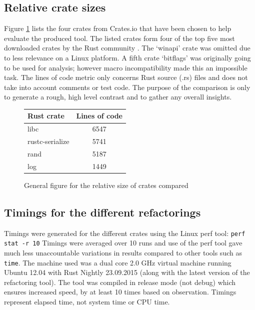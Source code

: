 \subsection{Relative crate sizes}
Figure \ref{Fig:codesize} lists the four crates from Crates.io that have been chosen to help evaluate the produced tool. The listed crates form four of the top five most downloaded crates by the Rust community \cite{cratesio15}. The `winapi' crate was omitted due to less relevance on a Linux platform. A fifth crate `bitflags' was originally going to be used for analysis; however macro incompatibility made this an impossible task. The lines of code metric only concerns Rust source (.rs) files and does not take into account comments or test code. The purpose of the comparison is only to generate a rough, high level contrast and to gather any overall insights. 

\begin{figure}[H]
\begin{center}
    \begin{tabular}{ | l | c |}
    \hline
    \textbf{Rust crate} & \textbf{Lines of code} \\ \hline
    libc & 6547 \\ \hline
    rustc-serialize &  5741 \\ \hline
    rand &   5187 \\ \hline
    log &  1449 \\ \hline
    \end{tabular}
\end{center}

\caption{General figure for the relative size of crates compared}
\label{Fig:codesize}
\end{figure}

\subsection{Timings for the different refactorings}
Timings were generated for the different crates using the Linux perf tool: {\verb|perf stat -r 10|} Timings were averaged over 10 runs and use of the perf tool gave much less unaccountable variations in results compared to other tools such as {\verb|time|}. The machine used was a dual core 2.0 GHz virtual machine running Ubuntu 12.04 with Rust Nightly 23.09.2015 (along with the latest version of the refactoring tool). The tool was compiled in release mode (not debug) which ensures increased speed, by at least 10 times based on observation. Timings represent elapsed time, not system time or CPU time.

